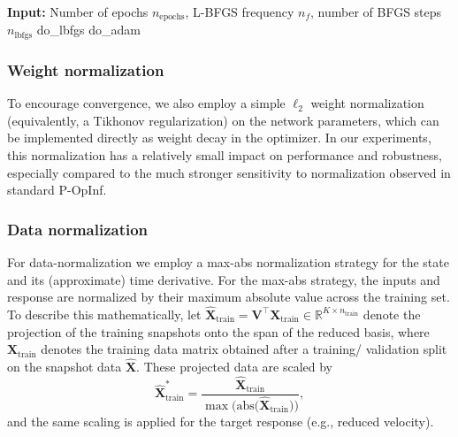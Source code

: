 \documentclass[3p,computermodern,11pt]{elsarticle}
\numberwithin{equation}{section}
\newcommand{\nBfgsSteps}{n_{\mathrm{lbfgs}}}
\newcommand{\snapshotsState}{\mathbf{X}}
\newcommand{\reducedSnapshotsState}{\hat{\mathbf{X}}}
\newcommand{\romBasis}{\mathbf{V}}
\newcommand{\params}{\boldsymbol \mu}
\newcommand{\RR}[1]{\mathbb{R}^{#1}}
\newcommand{\romDim}{K}
\begin{document}
\begin{algorithm}
    \caption{Training Algorithm with L-BFGS and Adam}
    \label{alg:hybrid}
    \begin{algorithmic}[1] %
        \STATE \textbf{Input:} Number of epochs \( n_{\text{epochs}} \), L-BFGS frequency \( n_f \), number of BFGS steps \(\nBfgsSteps \)
              \FOR{j = 1 to \( \nBfgsSteps\)}
                \STATE do\_lbfgs
              \ENDFOR
            \ENDIF
            \STATE do\_adam
        \ENDFOR
    \end{algorithmic}
\end{algorithm}


\subsubsection{Weight normalization}
To encourage convergence, we also employ a simple $\ell_2$ weight normalization (equivalently, a Tikhonov regularization) on the network parameters, which can be implemented directly as weight decay in the optimizer. In our experiments, this normalization has a relatively small impact on performance and robustness, especially compared to the much stronger sensitivity to normalization observed in standard P-OpInf.

\subsubsection{Data normalization}
For data-normalization we employ a max-abs normalization strategy for the state and its (approximate) time derivative. For the max-abs strategy, the inputs and response are normalized by their maximum absolute value across the training set. To describe this mathematically, let $\reducedSnapshotsState_{\mathrm{train}} = \romBasis^\intercal \snapshotsState_{\mathrm{train}}  \in \RR{\romDim \times n_{\mathrm{train}} }$ denote the 
projection of the training snapshots onto the span of the reduced basis, where $\snapshotsState_{\mathrm{train}}$ denotes the training data matrix obtained after a training/ validation split on the snapshot data $\reducedSnapshotsState$. These projected data are scaled by
$$\reducedSnapshotsState_{\mathrm{train}}^* = \frac{\reducedSnapshotsState_{\mathrm{train}} }{\max{\Big( \mathrm{abs} \big(  \reducedSnapshotsState_{\mathrm{train}}  \big) \Big) } }, $$
and the same scaling is applied for the target response (e.g., reduced velocity). %
\end{document}
